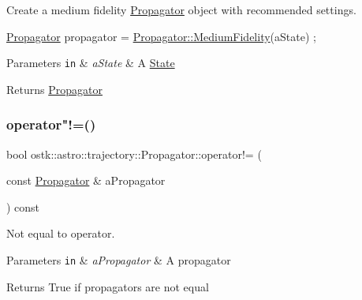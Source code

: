 Create a medium fidelity \hyperlink{classostk_1_1astro_1_1trajectory_1_1_propagator}{Propagator} object with recommended settings. 


\begin{DoxyCode}
\hyperlink{classostk_1_1astro_1_1trajectory_1_1_propagator_a3e3802b0eaa96a0e9422db11a7deac16}{Propagator} propagator = \hyperlink{classostk_1_1astro_1_1trajectory_1_1_propagator_a8d807b90b10f02edb732afe28dca0c04}{Propagator::MediumFidelity}(aState) ;
\end{DoxyCode}
 
\begin{DoxyParams}[1]{Parameters}
\mbox{\tt in}  & {\em a\+State} & A \hyperlink{classostk_1_1astro_1_1trajectory_1_1_state}{State} \\
\hline
\end{DoxyParams}
\begin{DoxyReturn}{Returns}
\hyperlink{classostk_1_1astro_1_1trajectory_1_1_propagator}{Propagator} 
\end{DoxyReturn}
\mbox{\label{classostk_1_1astro_1_1trajectory_1_1_propagator_a2f4ddff27e509435d7d512f5fefc10c7}} 
\subsubsection{\texorpdfstring{operator"!=()}{operator!=()}}
{\footnotesize\ttfamily bool ostk\+::astro\+::trajectory\+::\+Propagator\+::operator!= (\begin{DoxyParamCaption}\item[{const \hyperlink{classostk_1_1astro_1_1trajectory_1_1_propagator}{Propagator} \&}]{a\+Propagator }\end{DoxyParamCaption}) const}



Not equal to operator. 


\begin{DoxyParams}[1]{Parameters}
\mbox{\tt in}  & {\em a\+Propagator} & A propagator \\
\hline
\end{DoxyParams}
\begin{DoxyReturn}{Returns}
True if propagators are not equal 
\end{DoxyReturn}
\mbox{\label{classostk_1_1astro_1_1trajectory_1_1_propagator_aa16a98d76cd120299dd62e2f1e1c9bb9}} 
